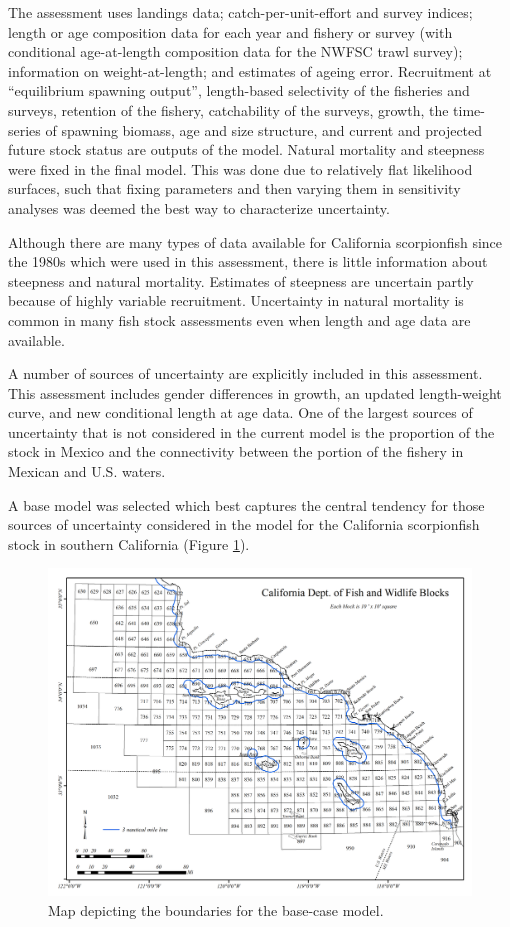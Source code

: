 \documentclass[12pt,]{article}
\begin{document}
The assessment uses landings data; catch-per-unit-effort and survey
indices; length or age composition data for each year and fishery or
survey (with conditional age-at-length composition data for the NWFSC
trawl survey); information on weight-at-length; and estimates of ageing
error. Recruitment at ``equilibrium spawning output'', length-based
selectivity of the fisheries and surveys, retention of the fishery,
catchability of the surveys, growth, the time-series of spawning
biomass, age and size structure, and current and projected future stock
status are outputs of the model. Natural mortality and steepness were
fixed in the final model. This was done due to relatively flat
likelihood surfaces, such that fixing parameters and then varying them
in sensitivity analyses was deemed the best way to characterize
uncertainty.

Although there are many types of data available for California
scorpionfish since the 1980s which were used in this assessment, there
is little information about steepness and natural mortality. Estimates
of steepness are uncertain partly because of highly variable
recruitment. Uncertainty in natural mortality is common in many fish
stock assessments even when length and age data are available.

A number of sources of uncertainty are explicitly included in this
assessment. This assessment includes gender differences in growth, an
updated length-weight curve, and new conditional length at age data. One
of the largest sources of uncertainty that is not considered in the
current model is the proportion of the stock in Mexico and the
connectivity between the portion of the fishery in Mexican and U.S.
waters.

A base model was selected which best captures the central tendency for
those sources of uncertainty considered in the model for the California
scorpionfish stock in southern California (Figure
\ref{fig:assess_region_map}).

\begin{figure}[htbp]
\centering
\includegraphics{Figures/assess_region_map.png}
\caption{Map depicting the boundaries for the base-case model.
\label{fig:assess_region_map}}
\end{figure}
\end{document}
